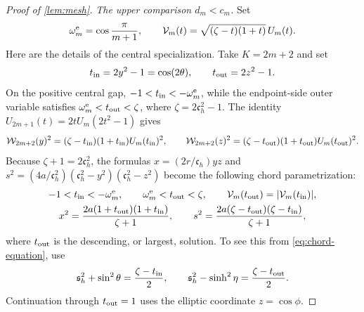 \documentclass[review,hidelinks,onefignum,onetabnum]{siamart251216}
\begin{document}
\begin{proof}[Proof of \cref{lem:mesh}]
\medskip\noindent\emph{The upper comparison \(d_m<c_m\).}\quad
Set
\[
 \omega_m^{\rm e}=\cos\frac{\pi}{m+1},\qquad
 \mathcal V_m(t)=\sqrt{(\zeta-t)(1+t)}\,U_m(t).
\]
Here are the details of the central specialization.  Take \(K=2m+2\)
and set
\[
 t_{\rm in}=2y^2-1=\cos(2\theta),\qquad
 t_{\rm out}=2z^2-1.
\]
On the positive central gap,
\(-1<t_{\rm in}<-\omega_m^{\rm e}\), while the endpoint-side outer variable
satisfies
\(\omega_m^{\rm e}<t_{\rm out}<\zeta\), where
\(\zeta=2\mathfrak c_h^2-1\).  The identity
\(U_{2m+1}(t)=2tU_m(2t^2-1)\) gives
\[
 \mathcal W_{2m+2}(y)^2
  = (\zeta-t_{\rm in})(1+t_{\rm in})U_m(t_{\rm in})^2,
 \qquad
 \mathcal W_{2m+2}(z)^2
  = (\zeta-t_{\rm out})(1+t_{\rm out})U_m(t_{\rm out})^2.
\]
Because \(\zeta+1=2\mathfrak c_h^2\), the formulas
\(x=(2r/\mathfrak c_h)yz\) and
\(s^2=(4a/\mathfrak c_h^2)
(\mathfrak c_h^2-y^2)(\mathfrak c_h^2-z^2)\) become the following chord
parametrization:
\begin{equation}\label{eq:central-chord}
\begin{gathered}
 -1<t_{\rm in}<-\omega_m^{\rm e},\qquad
 \omega_m^{\rm e}<t_{\rm out}<\zeta,\qquad
 \mathcal V_m(t_{\rm out})=|\mathcal V_m(t_{\rm in})|,\\
 x^2=\frac{2a(1+t_{\rm out})(1+t_{\rm in})}{\zeta+1},\qquad
 s^2=\frac{2a(\zeta-t_{\rm out})(\zeta-t_{\rm in})}{\zeta+1},
\end{gathered}
\end{equation}
where \(t_{\rm out}\) is the descending, or largest, solution.  To see this
from \eqref{eq:chord-equation}, use
\[
 \mathfrak s_h^2+\sin^2\theta=\frac{\zeta-t_{\rm in}}{2},\qquad
 \mathfrak s_h^2-\sinh^2\eta=\frac{\zeta-t_{\rm out}}{2}.
\]
Continuation through \(t_{\rm out}=1\) uses the elliptic coordinate
\(z=\cos\phi\).


\end{proof}
\end{document}
